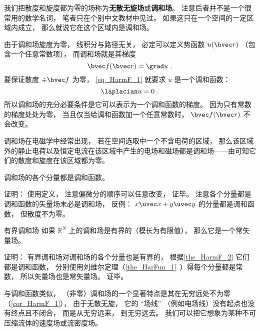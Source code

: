 


我们把散度和旋度都为零的场称为\textbf{无散无旋场}或\textbf{调和场}。 注意后者并不是一个很常用的数学名词， 笔者只在个别中文教材中见过。 如果这只在一个空间的一定区域内成立， 那么就说它在这个区域内是调和场。

由于调和场旋度为零， 线积分与路径无关， 必定可以定义势函数 $u(\bvec r)$ （包含一个任意常数项）， 而调和场就是其梯度
\begin{equation}\label{eq_HarmF_1}
\bvec f(\bvec r) = \grad u~.
\end{equation}
要保证散度 $\div \bvec f$ 为零， \autoref{eq_HarmF_1} 就要求 $u$ 是一个调和函数：
\begin{equation}
\laplacian u = 0~.
\end{equation}
所以调和场的充分必要条件是它可以表示为一个调和函数的梯度。 因为只有常数的梯度处处为零， 当且仅当给调和函数加一个任意常数时， $\bvec f(\bvec r)$ 不会改变。

调和场在电磁学中经常出现， 若在空间选取中一个不含电荷的区域， 那么该区域外的静止电荷以及恒定电流在该区域中产生的电场和磁场都是调和场——由可知它们的散度和旋度在该区域都为零。

\begin{theorem}{}\label{the_HarmF_2}
调和场的各个分量都是调和函数。
\end{theorem}
证明： 使用定义， 注意偏微分的顺序可以任意改变， 证毕。 注意各个分量都是调和函数的矢量场未必是调和场， 反例： $x\uvec x + y \uvec y$ 的分量都是调和函数， 但散度不为零。

\begin{corollary}{有界调和场}
如果 $\mathbb R^N$ 上的调和场是有界的（模长为有限值）， 那么它是一个常矢量场。
\end{corollary}
证明： 有界调和场对调和场的各个分量也是有界的， 根据\autoref{the_HarmF_2} 它们都是调和函数， 分别使用刘维尔定理（\autoref{the_HarFun_1}~）得每个分量都是常数， 所以矢量场也是常矢量场。 证毕。

与调和函数类似， （非零）调和场的一个显著特点是其在无穷远处不为零（\autoref{cor_HarmF_1}）， 由于无散无旋， 它的 “场线” （例如电场线）没有起点也没有终点且不闭合， 而是从无穷远来， 到无穷远去。 我们可以把它想象为某种不可压缩流体的速度场或流密度场。


